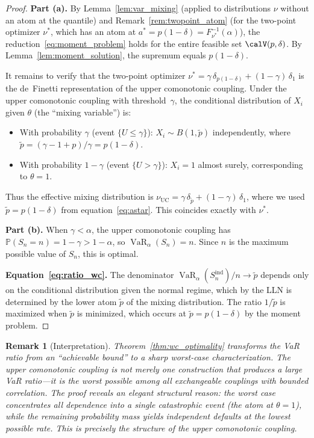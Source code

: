 \documentclass[11pt]{article}
\newtheorem{remark}[theorem]{Remark}
\theoremstyle{definition}
\newcommand{\VaR}{\operatorname{VaR}}
\newcommand{\PP}{\mathbb{P}}
\newcommand{\1}{\mathbf{1}}
\begin{document}
\begin{proof}
\textbf{Part (a).} By Lemma~\ref{lem:var_mixing} (applied to distributions $\nu$ without an atom at the quantile) and Remark~\ref{rem:twopoint_atom} (for the two-point optimizer $\nu^*$, which has an atom at $a^* = p(1-\delta) = F_{\nu^*}^{-1}(\alpha)$), the reduction~\eqref{eq:moment_problem} holds for the entire feasible set $\calV(p,\delta)$. By Lemma~\ref{lem:moment_solution}, the supremum equals $p(1-\delta)$.

It remains to verify that the two-point optimizer $\nu^* = \gamma\,\delta_{p(1-\delta)} + (1-\gamma)\,\delta_1$ is the de~Finetti representation of the upper comonotonic coupling. Under the upper comonotonic coupling with threshold~$\gamma$, the conditional distribution of $X_i$ given $\theta$ (the ``mixing variable'') is:
\begin{itemize}
  \item With probability $\gamma$ (event $\{U \leq \gamma\}$): $X_i \sim B(1, \tilde{p})$ independently, where $\tilde{p} = (\gamma - 1 + p)/\gamma = p(1-\delta)$.
  \item With probability $1-\gamma$ (event $\{U > \gamma\}$): $X_i = 1$ almost surely, corresponding to $\theta = 1$.
\end{itemize}
Thus the effective mixing distribution is $\nu_{\mathrm{UC}} = \gamma\,\delta_{\tilde{p}} + (1-\gamma)\,\delta_1$, where we used $\tilde{p} = p(1-\delta)$ from equation~\eqref{eq:astar}. This coincides exactly with $\nu^*$.

\textbf{Part (b).} When $\gamma < \alpha$, the upper comonotonic coupling has $\PP(S_n = n) = 1 - \gamma > 1 - \alpha$, so $\VaR_\alpha(S_n) = n$. Since $n$ is the maximum possible value of $S_n$, this is optimal.

\textbf{Equation~\eqref{eq:ratio_wc}.} The denominator $\VaR_\alpha(S_n^{\mathrm{ind}})/n \to \tilde{p}$ depends only on the conditional distribution given the normal regime, which by the LLN is determined by the lower atom $\tilde{p}$ of the mixing distribution. The ratio $1/\tilde{p}$ is maximized when $\tilde{p}$ is minimized, which occurs at $\tilde{p} = p(1-\delta)$ by the moment problem.
\end{proof}

\begin{remark}[Interpretation]\label{rem:ot_interpret}
Theorem~\ref{thm:wc_optimality} transforms the VaR ratio from an ``achievable bound'' to a \emph{sharp worst-case characterization}. The upper comonotonic coupling is not merely one construction that produces a large VaR ratio---it is the \emph{worst possible} among all exchangeable couplings with bounded correlation. The proof reveals an elegant structural reason: the worst case concentrates all dependence into a single catastrophic event (the atom at $\theta = 1$), while the remaining probability mass yields independent defaults at the lowest possible rate. This is precisely the structure of the upper comonotonic coupling.
\end{remark}
\end{document}
